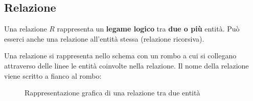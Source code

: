 \documentclass[a4paper,twoside]{article}
\begin{document}
\subsection{Relazione}
Una relazione \( R \) rappresenta un \textbf{legame logico} tra \textbf{due o più} entità.
Può esserci anche una relazione all'entità stessa (relazione ricorsiva).

\vspace{1em}
\noindent
Una relazione si rappresenta nello schema con un rombo a cui si collegano attraverso delle
linee le entità coinvolte nella relazione. Il nome della relazione viene scritto a fianco
al rombo:
\begin{figure}[H]
  \centering
  \caption{Rappresentazione grafica di una relazione tra due entità}
\end{figure}
\end{document}
